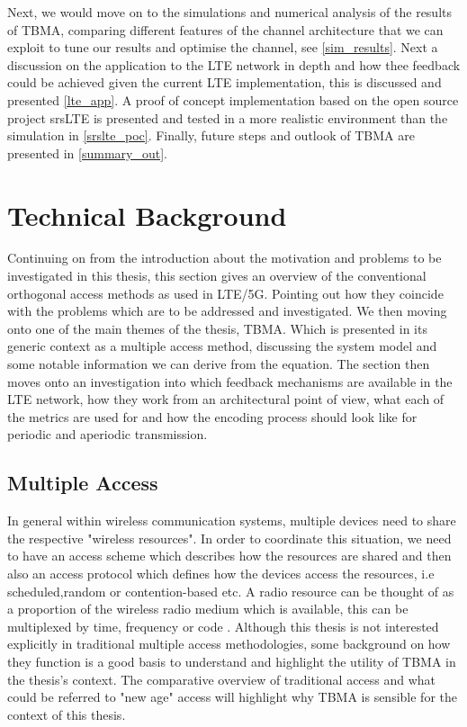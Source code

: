 \documentclass{article}
\begin{document}
Next, we would move on to the simulations and numerical analysis of the results of TBMA, comparing different features of the channel architecture that we can exploit to tune our results and optimise the channel, see \cref{sim_results}. Next a discussion on the application to the LTE network in depth and how thee feedback could be achieved given the current LTE implementation, this is discussed and presented \cref{lte_app}. A proof of concept implementation based on the open source project srsLTE is presented and tested in a more realistic environment than the simulation in \cref{srslte_poc}. Finally, future steps and outlook of TBMA are presented in \cref{summary_out}. 


\section{Technical Background} \label{sota}
Continuing on from the introduction about the motivation and problems to be investigated in this thesis, this section gives an overview of the conventional orthogonal access methods as used in  LTE/5G. Pointing out how they coincide with the problems which are to be addressed and investigated. We then moving onto one of the main themes of the thesis, \ac{TBMA}. Which is presented in its generic context as a multiple access method, discussing the system model and some notable information we can derive from the equation. The section then moves onto an investigation into which feedback mechanisms are available in the LTE network, how they work from an architectural point of view, what each of the metrics are used for and how the encoding process should look like for periodic and aperiodic transmission.
\subsection{Multiple Access}
In general within wireless communication systems, multiple devices need to share the respective "wireless resources". In order to coordinate this situation, we need to have an access scheme which describes how the resources are shared and then also an access protocol which defines how the devices access the resources, i.e scheduled,random or contention-based etc. A radio resource can be thought of as a proportion of the wireless radio medium which is available, this can be multiplexed by time, frequency or code \cite{access_tech}. Although this thesis is not interested explicitly in traditional multiple access methodologies, some background on how they function is a good basis to understand and highlight the utility of TBMA in the thesis's context. The comparative overview of traditional access and what could be referred to "new age" access will highlight why TBMA is sensible for the context of this thesis. 
\end{document}
